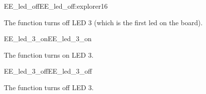 \begin{function_nopb2}{EE\_led\_off}{EE_led_off:explorer16}
  
  \begin{fundescription}
    The function turns off LED 3 (which is the first led on the board).
  \end{fundescription}
  
  
  
\end{function_nopb2}

\begin{function_nopb2}{EE\_led\_3\_on}{EE_led_3_on}
  
  \begin{fundescription}
    The function turns on LED 3.
  \end{fundescription}
  
  
  
\end{function_nopb2}

\begin{function_nopb2}{EE\_led\_3\_off}{EE_led_3_off}
  
  \begin{fundescription}
    The function turns off LED 3.
  \end{fundescription}
  
  
  
\end{function_nopb2}

